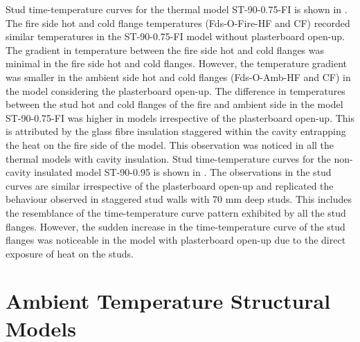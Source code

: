 Stud time-temperature curves for the thermal model ST-90-0.75-FI is shown in . The fire side hot and cold flange temperatures (Fds-O-Fire-HF and CF) recorded similar temperatures in the ST-90-0.75-FI model without plasterboard open-up. The gradient in temperature between the fire side hot and cold flanges was minimal in the fire side hot and cold flanges. However, the temperature gradient was smaller in the ambient side hot and cold flanges (Fds-O-Amb-HF and CF) in the model considering the plasterboard open-up. The difference in temperatures between the stud hot and cold flanges of the fire and ambient side in the model ST-90-0.75-FI was higher in models irrespective of the plasterboard open-up. This is attributed by the glass fibre insulation staggered within the cavity entrapping the heat on the fire side of the model. This observation was noticed in all the thermal models with cavity insulation. Stud time-temperature curves for the non-cavity insulated model ST-90-0.95 is shown in . The observations in the stud curves are similar irrespective of the plasterboard open-up and replicated the behaviour observed in staggered stud walls with 70 mm deep studs. This includes the resemblance of the time-temperature curve pattern exhibited by all the  stud flanges. However, the sudden increase in the time-temperature curve of the stud flanges was noticeable in the model with plasterboard open-up due to the direct exposure of heat on the studs.   

\section{Ambient Temperature Structural Models}

